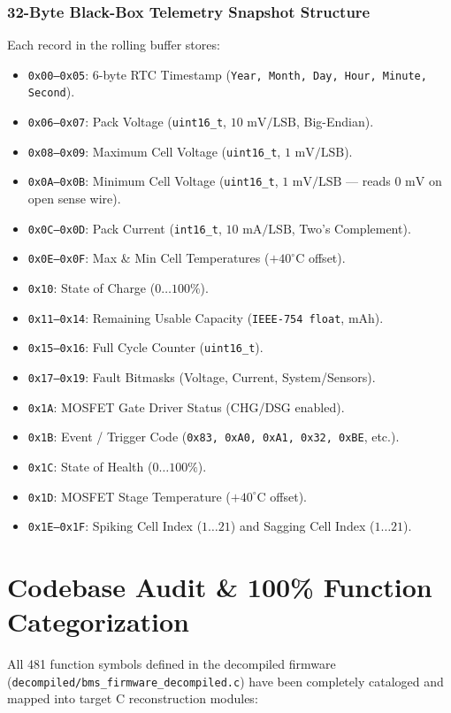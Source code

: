 \documentclass[10pt,a4paper]{article}
\begin{document}
\subsubsection{32-Byte Black-Box Telemetry Snapshot Structure}
Each record in the rolling buffer stores:
\begin{itemize}
    \item \texttt{0x00--0x05}: 6-byte RTC Timestamp (\texttt{Year, Month, Day, Hour, Minute, Second}).
    \item \texttt{0x06--0x07}: Pack Voltage (\texttt{uint16\_t}, $10\text{ mV/LSB}$, Big-Endian).
    \item \texttt{0x08--0x09}: Maximum Cell Voltage (\texttt{uint16\_t}, $1\text{ mV/LSB}$).
    \item \texttt{0x0A--0x0B}: Minimum Cell Voltage (\texttt{uint16\_t}, $1\text{ mV/LSB}$ --- reads $0\text{ mV}$ on open sense wire).
    \item \texttt{0x0C--0x0D}: Pack Current (\texttt{int16\_t}, $10\text{ mA/LSB}$, Two's Complement).
    \item \texttt{0x0E--0x0F}: Max \& Min Cell Temperatures ($+40^\circ\text{C}$ offset).
    \item \texttt{0x10}: State of Charge ($0\dots 100\%$).
    \item \texttt{0x11--0x14}: Remaining Usable Capacity (\texttt{IEEE-754 float}, mAh).
    \item \texttt{0x15--0x16}: Full Cycle Counter (\texttt{uint16\_t}).
    \item \texttt{0x17--0x19}: Fault Bitmasks (Voltage, Current, System/Sensors).
    \item \texttt{0x1A}: MOSFET Gate Driver Status (CHG/DSG enabled).
    \item \texttt{0x1B}: Event / Trigger Code (\texttt{0x83, 0xA0, 0xA1, 0x32, 0xBE}, etc.).
    \item \texttt{0x1C}: State of Health ($0\dots 100\%$).
    \item \texttt{0x1D}: MOSFET Stage Temperature ($+40^\circ\text{C}$ offset).
    \item \texttt{0x1E--0x1F}: Spiking Cell Index ($1\dots 21$) and Sagging Cell Index ($1\dots 21$).
\end{itemize}

\section{Codebase Audit \& 100\% Function Categorization}
All 481 function symbols defined in the decompiled firmware (\texttt{decompiled/bms\_firmware\_decompiled.c}) have been completely cataloged and mapped into target C reconstruction modules:
\end{document}
